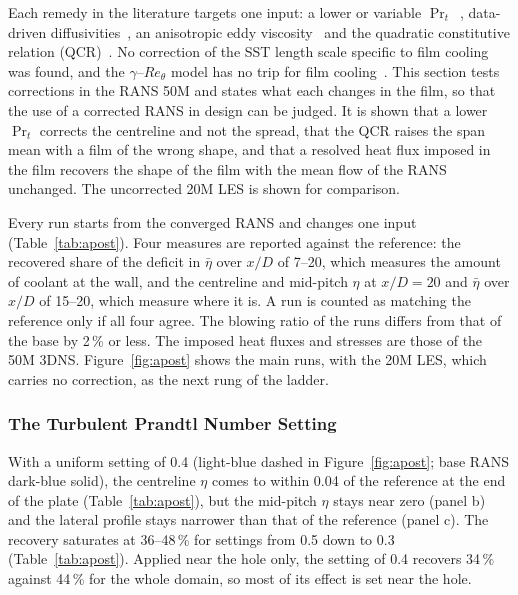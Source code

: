 \documentclass[colorlinks,upint,subscriptcorrection,varvw,hyphenate,balance,lineno]{asmeconf}
\newcommand*{\Reth}{\mathit{Re}_\theta}
\newcommand*{\etab}{\bar\eta}
\begin{document}
Each remedy in the literature targets one input: a lower or variable $\Pr_t$~\cite{liu2008,liu2011,lakehal2002},
data-driven diffusivities~\cite{milani2017,milani2020}, an anisotropic eddy viscosity~\cite{azzi2002} and the
quadratic constitutive relation (QCR)~\cite{spalart2000}. No correction of the SST length scale specific to film
cooling was found, and the $\gamma$--$\Reth$ model has no trip for film cooling~\cite{langtry2009}. This section
tests corrections in the RANS 50M and states what each changes in the film, so that the use of a corrected RANS
in design can be judged. It is shown that a lower $\Pr_t$ corrects the centreline and not the spread, that the QCR
raises the span mean with a film of the wrong shape, and that a resolved heat flux imposed in the film recovers the
shape of the film with the mean flow of the RANS unchanged. The uncorrected 20M LES is shown for comparison.

Every run starts from the converged RANS and changes one input (Table~\ref{tab:apost}). Four measures are
reported against the reference: the recovered share of the deficit in $\etab$ over $x/D$ of 7--20, which measures
the amount of coolant at the wall, and the centreline and mid-pitch $\eta$ at $x/D=20$ and $\etab$ over $x/D$ of
15--20, which measure where it is. A run is counted as matching the reference only if all four agree. The blowing
ratio of the runs differs from that of the base by 2\,\% or less. The imposed heat fluxes and stresses are
those of the 50M 3DNS. Figure~\ref{fig:apost} shows the main runs, with the 20M LES, which carries no correction,
as the next rung of the ladder.

\subsubsection{The Turbulent Prandtl Number Setting}

With a uniform setting of 0.4 (light-blue dashed in Figure~\ref{fig:apost}; base RANS dark-blue solid), the
centreline $\eta$ comes to within 0.04 of the reference at the end of the plate (Table~\ref{tab:apost}), but the
mid-pitch $\eta$ stays near zero (panel b) and the lateral profile stays narrower than that of the reference
(panel c). The recovery saturates at 36--48\,\% for
settings from 0.5 down to 0.3 (Table~\ref{tab:apost}). Applied near the hole only, the setting of 0.4 recovers
34\,\% against 44\,\% for the whole domain, so most of its effect is set near the hole.
\end{document}

